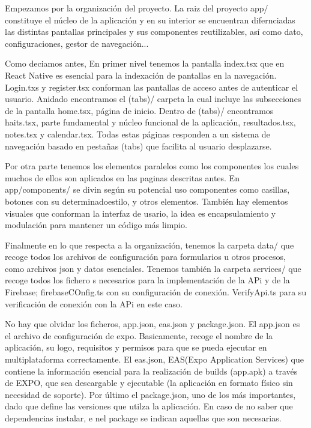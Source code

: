 Empezamos por la organización del proyecto. La raiz del proyecto app/ constituye el núcleo de la aplicación y en su interior se encuentran difernciadas las distintas pantallas principales y sus componentes reutilizables, así como dato, configuraciones, gestor de navegación...

Como deciamos antes, En primer nivel tenemos la pantalla index.tsx que en React Native es esencial para la indexación de pantallas en la navegación. Login.txs y register.tsx conforman las pantallas de acceso antes de autenticar el usuario. Anidado encontramos el (tabs)/ carpeta la cual incluye las subsecciones de la pantalla home.tsx, página de inicio. Dentro de (tabs)/ encontramos haits.tsx, parte fundamental y núcleo funcional de la aplicación, resultados.tsx, notes.tsx y calendar.tsx. Todas estas páginas responden a un sistema de navegación basado en pestañas (tabs) que facilita al usuario desplazarse.

Por otra parte tenemos los elementos paralelos como los componentes los cuales muchos de ellos son aplicados en las paginas descritas antes. En app/components/ se divin según su potencial uso componentes como casillas, botones con su determinadoestilo, y otros elementos. También hay elementos visuales que conforman la interfaz de usario, la idea es encapsulamiento y modulación para mantener un código más limpio.

Finalmente en lo que respecta a la organización, tenemos la carpeta data/ que recoge todos los archivos de configuración para formularios u otros procesos, como archivos json y datos esenciales. 
Tenemos también la carpeta services/ que recoge todos los fichero s necesarios para la implementación de la APi y de la Firebase; firebaseCOnfig.ts con su configuración de conexión. VerifyApi.ts para su verificación de conexión con la APi en este caso.

No hay que olvidar los ficheros, app.json, eas.json y package.json.
El app.json es el archivo de configuración de expo. Basicamente, recoge el nombre de la aplicación, su logo, requisitos y permisos para que se pueda ejecutar en multiplataforma correctamente. El eas.json, EAS(Expo Application Services) que contiene la información esencial para la realización de builds (app.apk) a través de EXPO,  que sea descargable y ejecutable (la aplicación en formato físico sin necesidad de soporte). Por último el package.json, uno de los más importantes, dado que define las versiones que utilza la aplicación. En caso de no saber que dependencias instalar, e nel package se indican aquellas que son necesarias.

